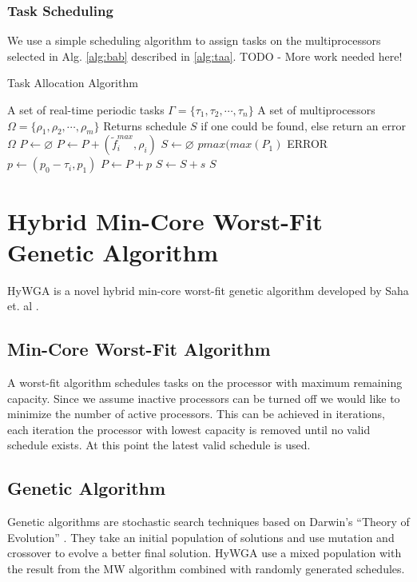 \documentclass[conference]{IEEEtran}
\begin{document}
\subsubsection{Task Scheduling}
We use a simple scheduling algorithm to assign tasks on the multiprocessors selected in Alg. \ref{alg:bab} described in \ref{alg:taa}.
TODO - More work needed here!

\begin{algorithm}
	\caption{Task Allocation Algorithm} \label{alg:taa}
	\begin{algorithmic}[1]
		\Require
			\Statex A set of real-time periodic tasks $\Gamma = \{\tau_1, \tau_2, \cdots, \tau_n\}$
			\Statex A set of multiprocessors $\Omega = \{\rho_1, \rho_2,\cdots, \rho_m\}$
		\Ensure
			\Statex Returns schedule $S$ if one could be found, else return an error $\Omega$
		\State $P \gets \varnothing$
			\State $P \gets P + (\tilde{f}_i^{max}, \rho_i)$
		\EndFor
		\State $S \gets \varnothing$
			\State $p max(max(P_1)$
				\State \Return ERROR
			\EndIf
			\State $p \gets (p_0 - \tau_i, p_1)$
			\State $P \gets P + p$
			\State $S \gets S + s$
		\EndFor
		\State \Return $S$
	\end{algorithmic}
\end{algorithm}

\section{Hybrid Min-Core Worst-Fit Genetic Algorithm}

HyWGA is a novel hybrid min-core worst-fit genetic algorithm developed by Saha et. al \cite{Saha12}.

\subsection{Min-Core Worst-Fit Algorithm}

A worst-fit algorithm schedules tasks on the processor with maximum remaining capacity. Since we assume inactive processors can be turned off we would like to minimize the number of active processors. This can be achieved in iterations, each iteration the processor with lowest capacity is removed until no valid schedule exists. At this point the latest valid schedule is used.


\subsection{Genetic Algorithm}
Genetic algorithms are stochastic search techniques based on Darwin's ``Theory of Evolution'' \cite{Goldberg}.
They take an initial population of solutions and use mutation and crossover to evolve a better final solution.
HyWGA use a mixed population with the result from the MW algorithm combined with randomly generated schedules.
\end{document}

